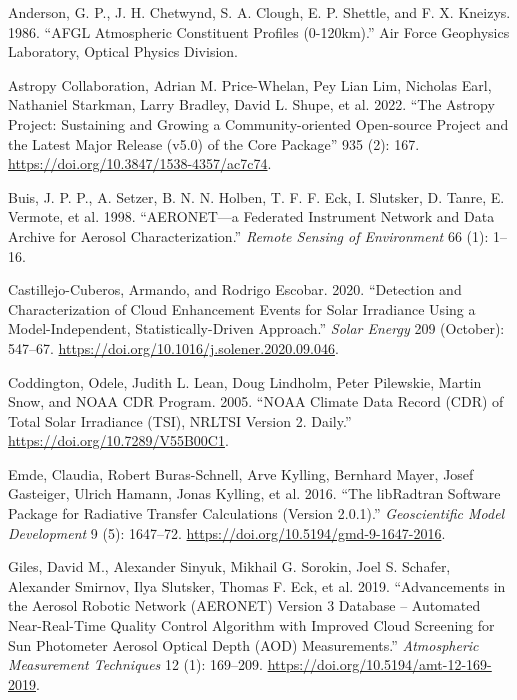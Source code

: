 \documentclass[
]{article}
\newlength{\cslhangindent}
\newlength{\cslentryspacingunit} %
\newenvironment{CSLReferences}[2] %
 {%
  \setlength{\parindent}{0pt}
  \ifodd #1
  \let\oldpar\par
  \def\par{\hangindent=\cslhangindent\oldpar}
  \fi
  \setlength{\parskip}{#2\cslentryspacingunit}
 }%
 {}
\begin{document}
\hypertarget{refs}{}
\begin{CSLReferences}{1}{0}
\leavevmode{}%
Anderson, G. P., J. H. Chetwynd, S. A. Clough, E. P. Shettle, and F. X. Kneizys. 1986. {``{AFGL} Atmospheric Constituent Profiles (0-120km).''} Air Force Geophysics Laboratory, Optical Physics Division.

\leavevmode{}%
Astropy Collaboration, Adrian M. Price-Whelan, Pey Lian Lim, Nicholas Earl, Nathaniel Starkman, Larry Bradley, David L. Shupe, et al. 2022. {``{The Astropy Project: Sustaining and Growing a Community-oriented Open-source Project and the Latest Major Release (v5.0) of the Core Package}''} 935 (2): 167. \url{https://doi.org/10.3847/1538-4357/ac7c74}.

\leavevmode{}%
Buis, J. P. P., A. Setzer, B. N. N. Holben, T. F. F. Eck, I. Slutsker, D. Tanre, E. Vermote, et al. 1998. {``AERONET---a Federated Instrument Network and Data Archive for Aerosol Characterization.''} \emph{Remote Sensing of Environment} 66 (1): 1--16.

\leavevmode{}%
Castillejo-Cuberos, Armando, and Rodrigo Escobar. 2020. {``Detection and Characterization of Cloud Enhancement Events for Solar Irradiance Using a Model-Independent, Statistically-Driven Approach.''} \emph{Solar Energy} 209 (October): 547--67. \url{https://doi.org/10.1016/j.solener.2020.09.046}.

\leavevmode{}%
Coddington, Odele, Judith L. Lean, Doug Lindholm, Peter Pilewskie, Martin Snow, and NOAA CDR Program. 2005. {``{NOAA} Climate Data Record ({CDR}) of Total Solar Irradiance ({TSI}), {NRLTSI} Version 2. {D}aily.''} \url{https://doi.org/10.7289/V55B00C1}.

\leavevmode{}%
Emde, Claudia, Robert Buras-Schnell, Arve Kylling, Bernhard Mayer, Josef Gasteiger, Ulrich Hamann, Jonas Kylling, et al. 2016. {``The {libRadtran} Software Package for Radiative Transfer Calculations (Version 2.0.1).''} \emph{Geoscientific Model Development} 9 (5): 1647--72. \url{https://doi.org/10.5194/gmd-9-1647-2016}.

\leavevmode{}%
Giles, David M., Alexander Sinyuk, Mikhail G. Sorokin, Joel S. Schafer, Alexander Smirnov, Ilya Slutsker, Thomas F. Eck, et al. 2019. {``Advancements in the Aerosol Robotic Network ({AERONET}) Version 3 Database -- Automated Near-Real-Time Quality Control Algorithm with Improved Cloud Screening for Sun Photometer Aerosol Optical Depth ({AOD}) Measurements.''} \emph{Atmospheric Measurement Techniques} 12 (1): 169--209. \url{https://doi.org/10.5194/amt-12-169-2019}.


\end{CSLReferences}
\end{document}
